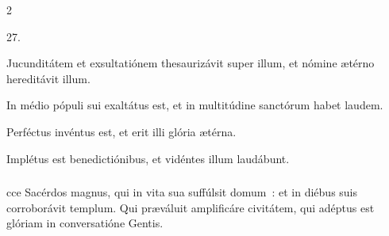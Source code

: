\documentclass[9pt,twoside]{extarticle}
\begin{document}
\begin{multicols}{2}
{{{\begin{tightlist}{}
\item {} 27.
\item {} Jucunditátem et exsultatiónem thesaurizávit super illum, et nómine ætérno hereditávit illum.
\item {} In médio pópuli sui exaltátus est, et in multitúdine sanctórum habet laudem.
\item {} Perféctus invéntus est, et erit illi glória ætérna.
\item {} Implétus est benedictiónibus, et vidéntes illum laudábunt.
\end{tightlist}

\subsubsection*{}
cce Sacérdos magnus, qui in vita sua suffúlsit domum~: et in diébus suis corroborávit templum. Qui præváluit amplificáre civitátem, qui adéptus est glóriam in conversatióne Gentis.

}}}
\end{multicols}
\end{document}
